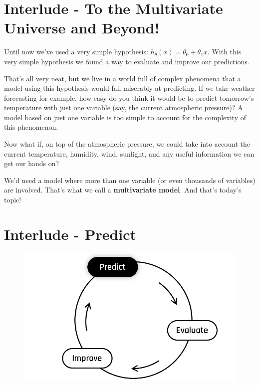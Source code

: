 
\section*{Interlude - To the Multivariate Universe and Beyond!}

Until now we've used a very simple hypothesis: $h_{\theta}(x) = \theta_0 + \theta_1 x$.
With this very simple hypothesis we found a way to evaluate and improve our predictions.  

That's all very neat, but we live in a world full of complex phenomena that a model using
this hypothesis would fail miserably at predicting.
If we take weather forecasting for example, how easy do you think it would be to predict tomorrow's temperature with just one variable (say, the current atmospheric pressure)?
A model based on just one variable is too simple to account for the complexity of this phenomenon.

Now what if, on top of the atmospheric pressure, we could take into account the current temperature, humidity, wind, sunlight, and any useful information we can get our hands on?

We'd need a model where more than one variable (or even thousands of variables) are involved.
That's what we call a \textbf{multivariate model}.
And that's today's topic!

\section*{Interlude - Predict}

\begin{figure}[!h]
  \centering
  \includegraphics[scale=0.25]{assets/Predict.png}
\end{figure}

